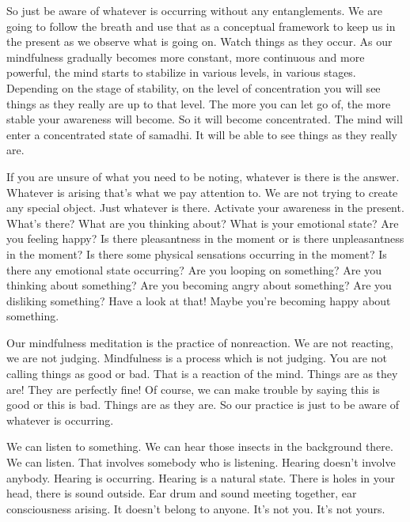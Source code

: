 \documentclass[letterpaper,10pt,english]{sphinxmanual}
\begin{document}
\sphinxAtStartPar
So just be aware of whatever is occurring without any entanglements.
We are going to follow the breath and use that as a conceptual framework to
keep us in the present as we observe what is going on. Watch things as they
occur. As our mindfulness gradually becomes more constant, more continuous and more powerful, the mind starts to stabilize in various levels, in various stages. Depending on the stage of stability, on the level of concentration
you will see things as they really are up to that level. The more you can let
  go of, the more stable your awareness will become. So it will become concentrated. The mind will enter a concentrated state of samadhi. It will be able
to see things as they really are.

\sphinxAtStartPar
{}
If  you  are  unsure
of  what  you  need  to  be  noting,  whatever  is  there  is  the  answer. Whatever
is  arising  that’s  what  we  pay  attention  to. We  are  not  trying  to  create  any
special object. Just whatever is there. Activate your awareness in the present.  What’s  there?  What  are  you  thinking  about?  What  is  your  emotional
state? Are you feeling happy? Is there pleasantness in the moment or is there
unpleasantness in the moment? Is there some physical sensations occurring
in the moment? Is there any emotional state occurring? Are you looping on
something? Are  you  thinking  about  something? Are  you  becoming  angry
about something? Are you disliking something? Have a look at that! Maybe
you’re becoming happy about something.

\sphinxAtStartPar
Our mindfulness meditation is the practice of non\sphinxhyphen{}reaction. We are not
reacting, we are not judging. Mindfulness is a process which is not judging.
You  are  not  calling  things  as  good  or  bad. That  is  a  reaction  of  the  mind.
Things  are  as  they  are!  They  are  perfectly  fine!  Of  course,  we  can  make
trouble by saying this is good or this is bad. Things are as they are. So our
practice is just to be aware of whatever is occurring.

\sphinxAtStartPar
We  can  listen  to  something.  We  can  hear  those  insects  in  the  background there. We can listen. That involves somebody who is listening. Hearing doesn’t involve anybody. Hearing is occurring. Hearing is a natural state.
There  is  holes  in  your  head,  there  is  sound  outside.  Ear  drum  and  sound
meeting together, ear consciousness arising. It doesn’t belong to anyone. It’s
not you. It’s not yours.
\end{document}
